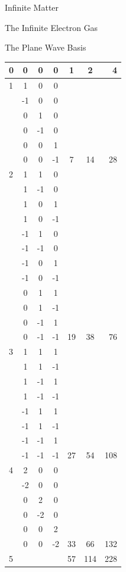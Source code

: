 \documentclass[twoside,english]{uiofysmaster}
\begin{document}
\begin{chapter}{Infinite Matter}
\begin{section}{The Infinite Electron Gas}
\begin{subsection}{The Plane Wave Basis}
\begin{table}[H]
\begin{center}
\begin{tabular}[center]{l | c c c | c | c | r }
						\hline
						0 & 0 & 0 & 0 & 1 & 2 & 4 \\
						\hline
						1 & 1 & 0 & 0 &   &   &   \\
						  & -1& 0 & 0 &   &   &   \\
						  & 0 & 1 & 0 &   &   &   \\
						  & 0 & -1& 0 &   &   &   \\
						  & 0 & 0 & 1 &   &   &   \\
						  & 0 & 0 & -1& 7 & 14& 28\\
						\hline
						2 & 1 & 1 & 0 &   &   &   \\
						  & 1 & -1& 0 &   &   &   \\
						  & 1 & 0 & 1 &   &   &   \\
						  & 1 & 0 & -1&   &   &   \\
						  & -1& 1 & 0 &   &   &   \\
						  & -1& -1& 0 &   &   &   \\
						  & -1& 0 & 1 &   &   &   \\
						  & -1& 0 & -1&   &   &   \\
						  & 0 & 1 & 1 &   &   &   \\
						  & 0 & 1 & -1&   &   &   \\
						  & 0 & -1& 1 &   &   &   \\
						  & 0 & -1& -1&19 &38 & 76\\
						\hline
						3 & 1 & 1 & 1 &   &   &   \\
						  & 1 & 1 & -1&   &   &   \\
						  & 1 & -1& 1 &   &   &   \\
						  & 1 & -1& -1&   &   &   \\
						  & -1& 1 & 1 &   &   &   \\
						  & -1& 1 & -1&   &   &   \\
						  & -1& -1& 1 &   &   &   \\
						  & -1& -1& -1&27 & 54&108\\
						\hline
						4 & 2 & 0 & 0 &   &   &   \\
						  & -2& 0 & 0 &   &   &   \\
						  & 0 & 2 & 0 &   &   &   \\
						  & 0 & -2& 0 &   &   &   \\
						  & 0 & 0 & 2 &   &   &   \\
						  & 0 & 0 & -2& 33& 66&132\\
						\hline
						5 &   &   &   & 57&114&228\\

\end{tabular}
\end{center}
\end{table}
\end{subsection}
\end{section}
\end{chapter}
\end{document}
